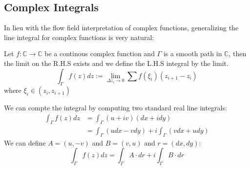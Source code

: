 \subsection{Complex Integrals}

%
\providecommand{\argmin}{\operatorname*{arg\,min}}%
\providecommand{\argmax}{\operatorname*{arg\,max}}%
In lieu with the flow field interpretation of complex functions, generalizing the line integral for complex functions is very natural:

\begin{definition}Let $f:\mathbb{C}\to \mathbb{C}$ be a continous complex function and $\Gamma$ is a smooth path in $\mathbb{C}$, then the limit on the R.H.S exists and we define the L.H.S
integral by the limit.
\begin{equation}
\int_{\Gamma} f(z)dz:=\lim_{\Delta z_i\to 0}\sum f(\xi_i)(z_{i+1}-z_i)
\end{equation}
where $\xi_i \in (z_i,z_{i+1})$

\end{definition}We can compte the integral by computing two standard real line integrals:
\begin{equation}
\begin{aligned}
\int_{\Gamma} f(z)dz &=\int_{\Gamma} (u+iv)(dx+idy) \\
&=\int_{\Gamma} (udx-vdy) + i\int_{\Gamma} (vdx+udy)
\end{aligned}
\end{equation}
We can define $A=(u, -v)$ and $B=(v,u)$ and $r=(dx,dy)$:
\begin{equation}
\int_{\Gamma} f(z)dz = \int_{\Gamma} A\cdot dr + i\int_{\Gamma}B\cdot dr
\end{equation}